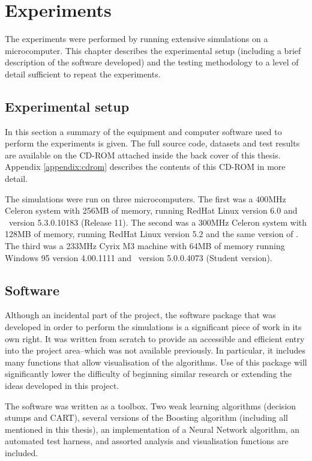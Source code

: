 

\chapter{Experiments}
\label{chapter:method}

The experiments were performed by running extensive simulations on a
microcomputer.  This chapter describes the experimental setup (including a
brief description of the software developed) and the testing
methodology to a level of detail sufficient to repeat the
experiments.

\section{Experimental setup}

In this section a summary of the equipment and computer software used
to perform the experiments is given.  The full source code, datasets
and test results are available on the CD-ROM attached inside the back
cover of this thesis.  Appendix \ref{appendix:cdrom} describes the
contents of this CD-ROM in more detail.

The simulations were run on three microcomputers.  The first was a
400MHz Celeron system with 256MB of memory, running RedHat Linux
version 6.0 and \MATLAB\ version 5.3.0.10183 (Release 11).  The second
was a 300MHz Celeron system with 128MB of memory, running RedHat Linux
version 5.2 and the same version of \MATLAB.  The third was a 233MHz
Cyrix M3 machine with 64MB of memory running Windows 95 version
4.00.1111 and \MATLAB\ version 5.0.0.4073 (Student version).

\section{Software}

Although an incidental part of the project, the software package that
was developed in order to perform the simulations is a significant
piece of work in its own right.  It was written from scratch to
provide an accessible and efficient entry into the project area--which
was not available previously.  In particular, it includes many
functions that allow visualisation of the algorithms.  Use of this
package will significantly lower the difficulty of beginning similar
research or extending the ideas developed in this project.

The software was written as a \MATLAB toolbox.  Two weak learning
algorithms (decision stumps and CART), several versions of the
Boosting algorithm (including all mentioned in this thesis), an
implementation of a Neural Network algorithm, an automated test
harness, and assorted analysis and visualisation functions are
included.

